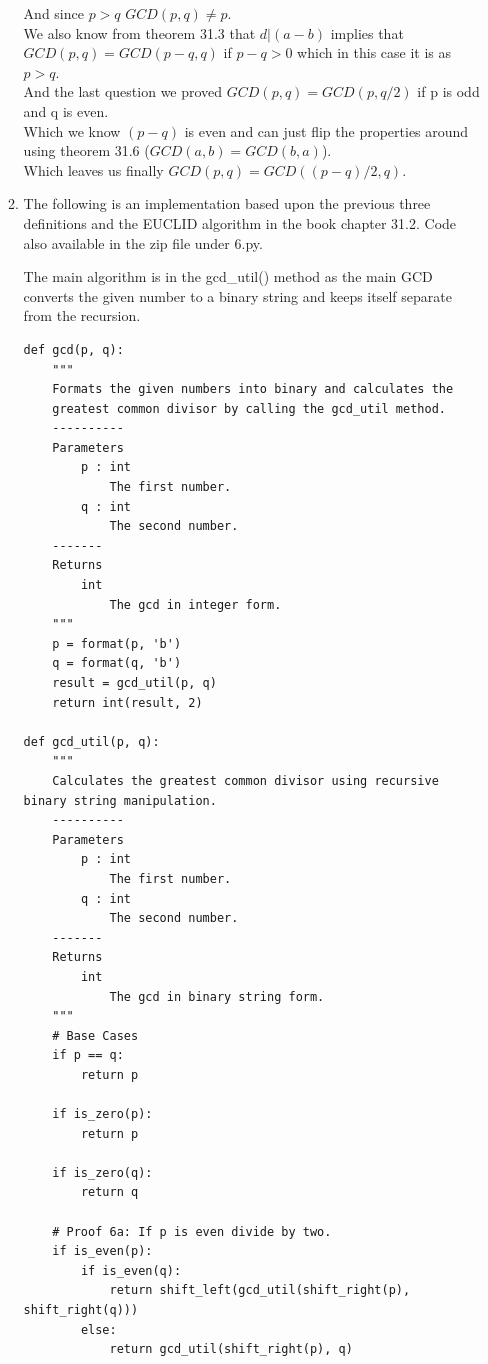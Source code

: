 \documentclass{article}
\begin{document}
\begin{enumerate}
\begin{enumerate}
        And since $p > q$ $GCD(p, q) \neq p$.\\

        We also know from theorem 31.3 that $d | (a - b)$ implies that $GCD(p, q) = GCD(p - q, q)$ if $p - q > 0$ which in this case it is as $p > q$.\\

        And the last question we proved $GCD(p, q) = GCD(p, q / 2)$ if p is odd and q is even.\\

        Which we know $(p - q)$ is even and can just flip the properties around using theorem 31.6 ($GCD(a, b) = GCD(b, a)$).\\

        Which leaves us finally $GCD(p, q) = GCD((p - q) / 2, q)$.
        
        
        \item The following is an implementation based upon the previous three definitions and the EUCLID algorithm in the book chapter 31.2. Code also available in the zip file under 6.py.
        
        The main algorithm is in the gcd\_util() method as the main GCD converts the given number to a binary string and keeps itself separate from the recursion.
        
        \begin{lstlisting}
def gcd(p, q):
    """
    Formats the given numbers into binary and calculates the 
    greatest common divisor by calling the gcd_util method.
    ----------
    Parameters
        p : int
            The first number.
        q : int
            The second number.    
    -------
    Returns
        int
            The gcd in integer form.
    """
    p = format(p, 'b')
    q = format(q, 'b')
    result = gcd_util(p, q)
    return int(result, 2)

def gcd_util(p, q):
    """
    Calculates the greatest common divisor using recursive binary string manipulation.
    ----------
    Parameters
        p : int
            The first number.
        q : int
            The second number.      
    -------
    Returns
        int
            The gcd in binary string form.
    """
    # Base Cases
    if p == q:
        return p

    if is_zero(p):
        return p

    if is_zero(q):
        return q

    # Proof 6a: If p is even divide by two.
    if is_even(p):
        if is_even(q):
            return shift_left(gcd_util(shift_right(p), shift_right(q)))
        else:
            return gcd_util(shift_right(p), q)


\end{lstlisting}
\end{enumerate}
\end{enumerate}
\end{document}
